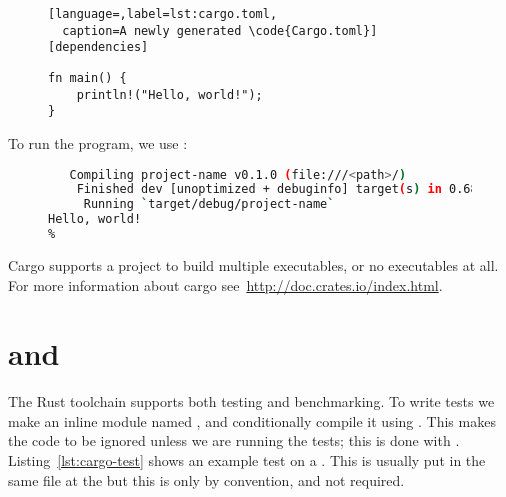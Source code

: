 \documentclass[b5paper]{report}
\begin{document}
\begin{appendices}
\begin{figure}[ht]
\begin{lstlisting}[language=,label=lst:cargo.toml,
  caption=A newly generated \code{Cargo.toml}]
[dependencies]
  \end{lstlisting}
\end{figure}

\begin{figure}[ht]
  \begin{lstlisting}[caption=Hello World in Rust,label=lst:hello-world]
fn main() {
    println!("Hello, world!");
}
  \end{lstlisting}
\end{figure}

  To run the program, we use \cargo{}:

  \begin{figure}[ht]
  \begin{lstlisting}[language=Bash,numbers=none]
% cargo run
   Compiling project-name v0.1.0 (file:///<path>/)
    Finished dev [unoptimized + debuginfo] target(s) in 0.68 secs
     Running `target/debug/project-name`
Hello, world!
%
  \end{lstlisting}
\end{figure}

  Cargo supports a project to build multiple executables, or no executables at all.
  For more information about cargo see~\url{http://doc.crates.io/index.html}.

  \section{\code{\#[test]} and \code{\#[bench]}}
  \label{sec:rust-test}
  The Rust toolchain supports both testing and benchmarking. To write tests we
  make an inline module named , and conditionally compile it using
  . This makes the code to be ignored unless we are running
  the tests; this is done with . Listing~\ref{lst:cargo-test}
  shows an example test on a . This is usually put in the same file
  at the  but this is only by convention, and not required.


\end{appendices}
\end{document}
